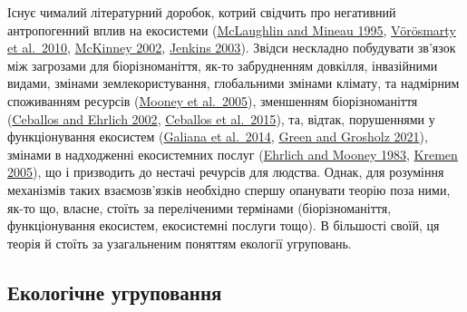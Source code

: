 \documentclass[
  11pt,
]{book}
\begin{document}
Існує чималий літературний доробок, котрий свідчить про негативний
антропогенний вплив на екосистеми
(\href{htpps://doi.org/10.1016/0167-8809(95)00609-V}{McLaughlin and
Mineau 1995}, \href{https://doi.org/10.1038/nature09440}{Vörösmarty et
al.~2010},
\href{https://academic.oup.com/bioscience/article/52/10/883-890/354714}{McKinney
2002}, \href{https://doi.org/10.1126/science.1088666}{Jenkins 2003}).
Звідси нескладно побудувати зв'язок між загрозами для біорізноманіття,
як-то забрудненням довкілля, інвазійними видами, змінами
землекористування, глобальними змінами клімату, та надмірним споживанням
ресурсів (\href{https://www.millenniumassessment.org/}{Mooney et
al.~2005}), зменшенням біорізноманіття
(\href{https://doi.org/10.1126/science.1069349}{Ceballos and Ehrlich
2002}, \href{https://doi.org/10.1126/sciadv.1400253}{Ceballos et
al.~2015}), та, відтак, порушеннями у функціонування екосистем
(\href{https://doi.org/10.1111/j.1600-0706.2013.00859.x}{Galiana et
al.~2014}, \href{https://doi.org/https://doi.org/10.1002/fee.2277}{Green
and Grosholz 2021}), змінами в надходженні екосистемних послуг
(\href{https://doi.org/10.2307/1309037}{Ehrlich and Mooney 1983},
\href{https://doi.org/10.1111/j.1461-0248.2005.00751.x}{Kremen 2005}),
що і призводить до нестачі речурсів для людства. Однак, для розуміння
механізмів таких взаємозв'язків необхідно спершу опанувати теорію поза
ними, як-то що, власне, стоїть за переліченими термінами
(біорізноманіття, функціонування екосистем, екосистемні послуги тощо). В
більшості своїй, ця теорія й стоїть за узагальненим поняттям екології
угруповань.

\subsection{Екологічне угруповання}\label{community-def}
\end{document}
